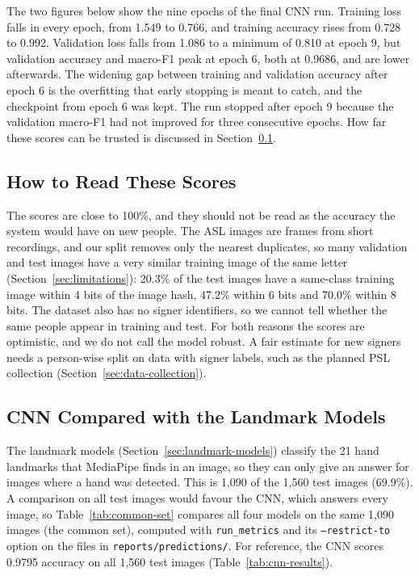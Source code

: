 The two figures below show the nine epochs of the final CNN run. Training loss falls in every epoch, from 1.549 to 0.766, and training accuracy rises from 0.728 to 0.992. Validation loss falls from 1.086 to a minimum of 0.810 at epoch 9, but validation accuracy and macro-F1 peak at epoch 6, both at 0.9686, and are lower afterwards. The widening gap between training and validation accuracy after epoch 6 is the overfitting that early stopping is meant to catch, and the checkpoint from epoch 6 was kept. The run stopped after epoch 9 because the validation macro-F1 had not improved for three consecutive epochs. How far these scores can be trusted is discussed in Section~\ref{sec:read-scores}.



\subsection{How to Read These Scores}
\label{sec:read-scores}

The scores are close to 100\%, and they should not be read as the accuracy the system would have on new people. The ASL images are frames from short recordings, and our split removes only the nearest duplicates, so many validation and test images have a very similar training image of the same letter (Section~\ref{sec:limitations}): 20.3\% of the test images have a same-class training image within 4 bits of the image hash, 47.2\% within 6 bits and 70.0\% within 8 bits. The dataset also has no signer identifiers, so we cannot tell whether the same people appear in training and test. For both reasons the scores are optimistic, and we do not call the model robust. A fair estimate for new signers needs a person-wise split on data with signer labels, such as the planned PSL collection (Section~\ref{sec:data-collection}).

\subsection{CNN Compared with the Landmark Models}

The landmark models (Section~\ref{sec:landmark-models}) classify the 21 hand landmarks that MediaPipe finds in an image, so they can only give an answer for images where a hand was detected. This is 1{,}090 of the 1{,}560 test images (69.9\%). A comparison on all test images would favour the CNN, which answers every image, so Table~\ref{tab:common-set} compares all four models on the same 1{,}090 images (the common set), computed with \texttt{run\_metrics} and its \texttt{--restrict-to} option on the files in \texttt{reports/predictions/}. For reference, the CNN scores 0.9795 accuracy on all 1{,}560 test images (Table~\ref{tab:cnn-results}).

